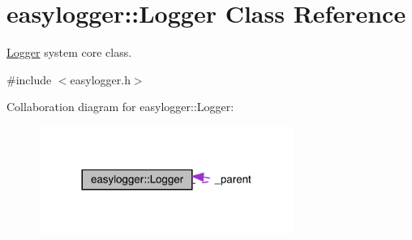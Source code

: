 \hypertarget{classeasylogger_1_1_logger}{}\section{easylogger\+:\+:Logger Class Reference}
\label{classeasylogger_1_1_logger}


\mbox{\hyperlink{classeasylogger_1_1_logger}{Logger}} system core class.  




{\ttfamily \#include $<$easylogger.\+h$>$}



Collaboration diagram for easylogger\+:\+:Logger\+:\nopagebreak
\begin{figure}[H]
\begin{center}
\leavevmode
\includegraphics[width=236pt]{classeasylogger_1_1_logger__coll__graph}
\end{center}
\end{figure}
